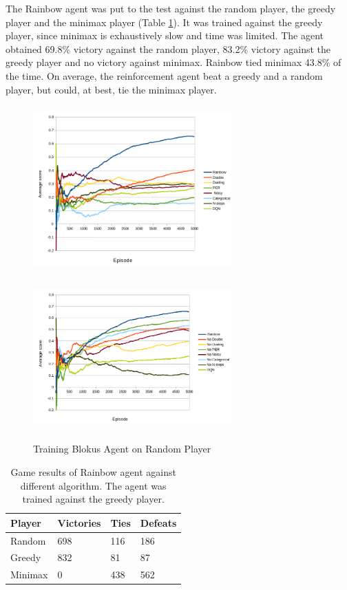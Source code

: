 \documentclass{article}
\begin{document}
The Rainbow agent was put to the test against the random player, the greedy player and the minimax player (Table \ref{tab:gameresults}). It was trained against the greedy player, since minimax is exhaustively slow and time was limited. The agent obtained 69.8\% victory against the random player, 83.2\% victory against the greedy player and no victory against minimax. Rainbow tied minimax 43.8\% of the time. On average, the reinforcement agent beat a greedy and a random player, but could, at best, tie the minimax player.

\begin{figure}[H]
\centering
\includegraphics[height=2.5in, width=3in]{training_random.png}

\includegraphics[height=2.5in, width=3in]{training_random_no.png}
\caption{Training Blokus Agent on Random Player}
\label{fig:trainingRandom}
\end{figure}

\begin{table}[H]
\centering
\begin{tabular}{llll}
\hline
 Player & Victories & Ties & Defeats \\
\hline
Random & 698 & 116 & 186 \\
Greedy & 832 & 81 & 87 \\
Minimax & 0 & 438 & 562 \\
\hline
\end{tabular}
\caption{Game results of Rainbow agent against different algorithm. The agent was trained against the greedy player.}
\label{tab:gameresults}
\end{table}
\end{document}
